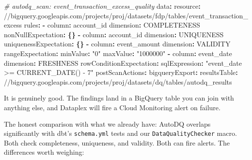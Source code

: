 \documentclass[
  11pt,
  british,
  oneside]{book}
\newenvironment{Shaded}{\begin{snugshade}}{\end{snugshade}}
\newcommand{\AttributeTok}[1]{\textcolor[rgb]{0.77,0.63,0.00}{#1}}
\newcommand{\CommentTok}[1]{\textcolor[rgb]{0.56,0.35,0.01}{\textit{#1}}}
\newcommand{\FunctionTok}[1]{\textcolor[rgb]{0.00,0.00,0.00}{#1}}
\newcommand{\KeywordTok}[1]{\textcolor[rgb]{0.13,0.29,0.53}{\textbf{#1}}}
\newcommand{\StringTok}[1]{\textcolor[rgb]{0.31,0.60,0.02}{#1}}
\begin{document}
\begin{Shaded}
\begin{Highlighting}[]
\CommentTok{\# autodq\_scan: event\_transaction\_excess\_quality}
\FunctionTok{data}\KeywordTok{:}
\AttributeTok{  }\FunctionTok{resource}\KeywordTok{:}\AttributeTok{ //bigquery.googleapis.com/projects/proj/datasets/fdp/tables/event\_transaction\_excess}
\FunctionTok{rules}\KeywordTok{:}
\AttributeTok{  }\KeywordTok{{-}}\AttributeTok{ }\FunctionTok{column}\KeywordTok{:}\AttributeTok{ account\_id}
\AttributeTok{    }\FunctionTok{dimension}\KeywordTok{:}\AttributeTok{ COMPLETENESS}
\AttributeTok{    }\FunctionTok{nonNullExpectation}\KeywordTok{:}\AttributeTok{ }\KeywordTok{\{\}}
\AttributeTok{  }\KeywordTok{{-}}\AttributeTok{ }\FunctionTok{column}\KeywordTok{:}\AttributeTok{ account\_id}
\AttributeTok{    }\FunctionTok{dimension}\KeywordTok{:}\AttributeTok{ UNIQUENESS}
\AttributeTok{    }\FunctionTok{uniquenessExpectation}\KeywordTok{:}\AttributeTok{ }\KeywordTok{\{\}}
\AttributeTok{  }\KeywordTok{{-}}\AttributeTok{ }\FunctionTok{column}\KeywordTok{:}\AttributeTok{ event\_amount}
\AttributeTok{    }\FunctionTok{dimension}\KeywordTok{:}\AttributeTok{ VALIDITY}
\AttributeTok{    }\FunctionTok{rangeExpectation}\KeywordTok{:}
\AttributeTok{      }\FunctionTok{minValue}\KeywordTok{:}\AttributeTok{ }\StringTok{"0"}
\AttributeTok{      }\FunctionTok{maxValue}\KeywordTok{:}\AttributeTok{ }\StringTok{"1000000"}
\AttributeTok{  }\KeywordTok{{-}}\AttributeTok{ }\FunctionTok{column}\KeywordTok{:}\AttributeTok{ event\_date}
\AttributeTok{    }\FunctionTok{dimension}\KeywordTok{:}\AttributeTok{ FRESHNESS}
\AttributeTok{    }\FunctionTok{rowConditionExpectation}\KeywordTok{:}
\AttributeTok{      }\FunctionTok{sqlExpression}\KeywordTok{:}\AttributeTok{ }\StringTok{"event\_date \textgreater{}= CURRENT\_DATE() {-} 7"}
\FunctionTok{postScanActions}\KeywordTok{:}
\AttributeTok{  }\FunctionTok{bigqueryExport}\KeywordTok{:}
\AttributeTok{    }\FunctionTok{resultsTable}\KeywordTok{:}\AttributeTok{ //bigquery.googleapis.com/projects/proj/datasets/dq/tables/autodq\_results}
\end{Highlighting}
\end{Shaded}

It is genuinely good. The findings land in a BigQuery table you can join
with anything else, and Dataplex will fire a Cloud Monitoring alert on
failure.

The honest comparison with what we already have: AutoDQ overlaps
significantly with dbt's \texttt{schema.yml} tests and our
\texttt{DataQualityChecker} macro. Both check completeness, uniqueness,
and validity. Both can fire alerts. The differences worth weighing:
\end{document}
